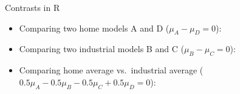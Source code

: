 \begin{frame}[fragile]{Contrasts in R}
  
  \begin{itemize}
  \item Comparing two home models A and D ($\mu_A-\mu_D=0$):
\begin{knitrout}
\color{fgcolor}\begin{kframe}
\begin{alltt}
\hlkwb{=}\hlstd{(}\hlstd{,}\hlstd{,}\hlstd{,}\hlopt{-}\hlstd{)}
\end{alltt}
\end{kframe}
\end{knitrout}

\item Comparing two industrial models B and C ($\mu_B-\mu_C=0$):
  
\begin{knitrout}
\color{fgcolor}\begin{kframe}
\begin{alltt}
\hlkwb{=}\hlstd{(}\hlstd{,}\hlstd{,}\hlopt{-}\hlstd{,}\hlstd{)}
\end{alltt}
\end{kframe}
\end{knitrout}

\item Comparing home average vs.\ industrial average ($0.5\mu_A-0.5\mu_B-0.5\mu_C+0.5\mu_D=0$):
  
\begin{knitrout}
\color{fgcolor}\begin{kframe}
\begin{alltt}
\hlkwb{=}\hlstd{(}\hlstd{,}\hlopt{-}\hlstd{,}\hlopt{-}\hlstd{,}\hlstd{)}
\end{alltt}
\end{kframe}
\end{knitrout}
  \end{itemize}
  
\end{frame}

